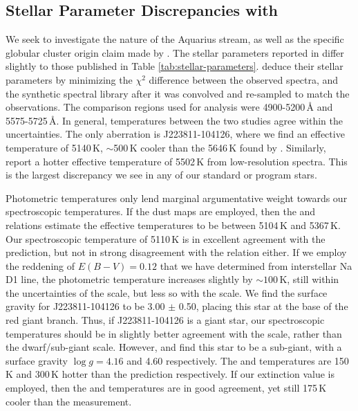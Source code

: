 \documentclass{emulateapj}
\begin{document}
\subsection{Stellar Parameter Discrepancies with \citet{wylie-de-boer;et-al_2012}}

We seek to investigate the nature of the Aquarius stream, as well as the specific globular cluster origin claim made by \citet{wylie-de-boer;et-al_2012}. The stellar parameters reported in \citet{wylie-de-boer;et-al_2012} differ slightly to those published in Table \ref{tab:stellar-parameters}. \citet{wylie-de-boer;et-al_2012} deduce their stellar parameters by minimizing the $\chi^2$ difference between the observed spectra, and the \citet{munari;et-al_2005} synthetic spectral library after it was convolved and re-sampled to match the observations. The comparison regions used for analysis were 4900-5200\,{\AA} and 5575-5725\,{\AA}. In general, temperatures between the two studies agree within the uncertainties. The only aberration is J223811-104126, where we find an effective temperature of 5140\,K, ${\sim}$500\,K cooler than the 5646\,K found by \citet{wylie-de-boer;et-al_2012}.  Similarly, \citet{williams;et-al_2011} report a hotter effective temperature of 5502\,K from low-resolution spectra. This is the largest discrepancy we see in any of our standard or program stars.

Photometric temperatures only lend marginal argumentative weight towards our spectroscopic temperatures. If the \citet{schlegel;et-al_1998} dust maps are employed, then the \citet{alonso;et-al_1999} and \citet{casagrande;et-al_2010} relations estimate the effective temperatures to be between 5104\,K and 5367\,K. Our spectroscopic temperature of 5110\,K is in excellent agreement with the \citet{alonso;et-al_1999} prediction, but not in strong disagreement with the \citet{casagrande;et-al_2010} relation either. If we employ the reddening of $E(B-V) = 0.12$ that we have determined from interstellar Na D1 line, the photometric temperature increases slightly by ${\sim}100$\,K, still within the uncertainties of the \citet{alonso;et-al_1999} scale, but less so with the \citet{casagrande;et-al_2010} scale. We find the surface gravity for J223811-104126 to be 3.00 $\pm$ 0.50, placing this star at the base of the red giant branch. Thus, if J223811-104126 is a giant star, our spectroscopic temperatures should be in slightly better agreement with the \citet{alonso;et-al_1999} scale, rather than the \citet{casagrande;et-al_2010} dwarf/sub-giant scale. However, \citet{williams;et-al_2011} and \citet{wylie-de-boer;et-al_2012} find this star to be a sub-giant, with a surface gravity $\log{g} = 4.16$ and 4.60 respectively. The \citet{williams;et-al_2011} and \citet{wylie-de-boer;et-al_2012} temperatures are 150\,K and 300\,K hotter than the \citet{casagrande;et-al_2010} prediction respectively. If our extinction value is employed, then the \citet{williams;et-al_2011} and \citet{casagrande;et-al_2010} temperatures are in good agreement, yet still 175\,K cooler than the \citet{wylie-de-boer;et-al_2012} measurement.
\end{document}

